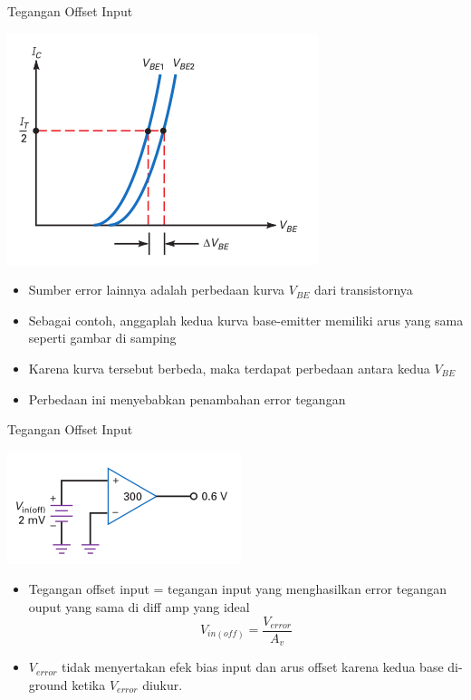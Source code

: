 \documentclass[aspectratio=169]{beamer}
\begin{document}
\begin{frame}{Tegangan Offset Input}
	\begin{multicols}{2}
		\begin{center}
			\includegraphics[height=0.7\textheight]{gambar/01.diff-amp/01.different_base-emitter_curves_added_to_error}
		\end{center}
		\columnbreak
		\begin{itemize}
			\item Sumber error lainnya adalah perbedaan kurva $ V_{BE} $ dari transistornya
			\item Sebagai contoh, anggaplah kedua kurva base-emitter memiliki arus yang sama seperti gambar di samping
			\item Karena kurva tersebut berbeda, maka terdapat perbedaan antara kedua $ V_{BE} $
			\item Perbedaan ini menyebabkan penambahan error tegangan
		\end{itemize}
	\end{multicols}
\end{frame}

\begin{frame}{Tegangan Offset Input}
	\begin{multicols}{2}
		\begin{center}
			\includegraphics[height=0.4\textheight]{gambar/01.diff-amp/01.input_offset_voltage_is_equivalent_to_an_unwanted_input_voltage}
		\end{center}
		\columnbreak
		\begin{itemize}
			\item Tegangan offset input = tegangan input yang menghasilkan error tegangan ouput yang sama di diff amp yang ideal
			\begin{equation}
				V_{in(off)} = \frac{V_{error}}{A_v}
			\end{equation}
			\item $ V_{error} $ tidak menyertakan efek bias input dan arus offset karena kedua base di-ground ketika $ V_{error} $ diukur.
		\end{itemize}
	\end{multicols}
\end{frame}
\end{document}
